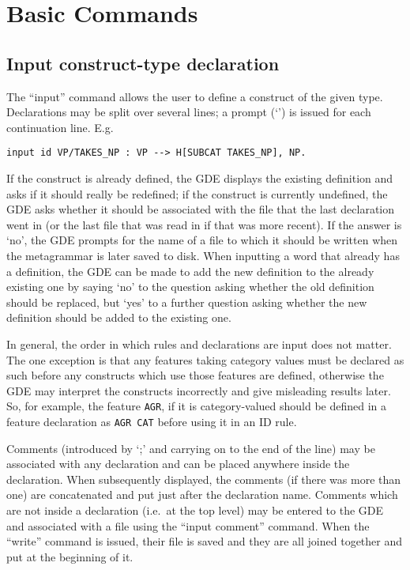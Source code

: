 \section{Basic Commands}

\subsection{Input construct-type declaration}

The ``input'' command allows the user to define a construct of the given
type. Declarations may be split over several lines; a prompt (`\ran')
is issued for each continuation line.
E.g.
\begin{ex}
\begin{verbatim}
input id VP/TAKES_NP : VP --> H[SUBCAT TAKES_NP], NP.
\end{verbatim}
\end{ex}
If the construct is already defined, the GDE displays the existing definition
and asks if it should really be redefined; if the construct is currently
undefined, the GDE asks whether it should be associated with the
file that the last declaration went in (or the last file that was read
in if that was more recent). If the answer is `no', the GDE
prompts for the name of a file to which it should be written when the
metagrammar is later saved to disk.
When inputting a word that already has a definition, the GDE
can be made to add the new definition to the already existing one by saying
`no' to the question asking whether the old definition should be replaced,
but `yes' to a further question asking whether the new definition should
be added to the existing one.

In general, the order in which rules and declarations are input does not
matter. The one exception is that any features taking category values
must be declared as such before any constructs which use those features
are defined, otherwise the GDE may interpret the constructs incorrectly
and give misleading results later. So, for example, the feature {\tt AGR},
if it is category-valued should be defined in a feature
declaration as {\tt AGR CAT} before using it in an ID rule.

Comments (introduced by `;' and carrying on to the end of the line)
may be associated with any declaration and can be placed anywhere inside
the declaration. When subsequently displayed, the comments (if there was
more than one) are concatenated and put just after the declaration
name.  Comments which are not inside a declaration (i.e.\ at the top
level) may be entered to the GDE and associated with a file using the
``input comment'' command. When the ``write'' command is issued, their
file is saved and they are all joined together and put at the beginning
of it.

